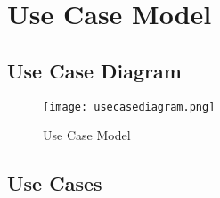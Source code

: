 \documentclass[11pt]{article}
\begin{document}
\newpage
\section{Use Case Model}

\subsection{Use Case Diagram}

\begin{figure}[h!]
	\centering
		\texttt{[image: usecasediagram.png]}
	\caption{Use Case Model}
	\label{fig:usecasemodel}
\end{figure}

\subsection{Use Cases}

\end{document}
